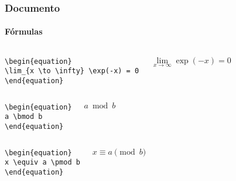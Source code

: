 \begin{frame}[fragile]
\frametitle{Documento}
\framesubtitle{Fórmulas}
  \scriptsize
  \begin{columns}[c]
  \begin{verbatim}
\begin{equation}
\lim_{x \to \infty} \exp(-x) = 0
\end{equation}
  \end{verbatim}
  \begin{fmpage}{\textwidth}
\begin{equation}
\lim_{x \to \infty} \exp(-x) = 0
\end{equation}
  \end{fmpage}
  \end{columns}


  \begin{columns}[c]
  \begin{verbatim}
\begin{equation}
a \bmod b
\end{equation}
  \end{verbatim}
  \begin{fmpage}{\textwidth}
\begin{equation}
a \bmod b
\end{equation}
  \end{fmpage}
  \end{columns}


  \begin{columns}[c]
  \begin{verbatim}
\begin{equation}
x \equiv a \pmod b
\end{equation}
  \end{verbatim}
  \begin{fmpage}{\textwidth}
\begin{equation}
x \equiv a \pmod b
\end{equation}
  \end{fmpage}
  \end{columns}
\end{frame}


